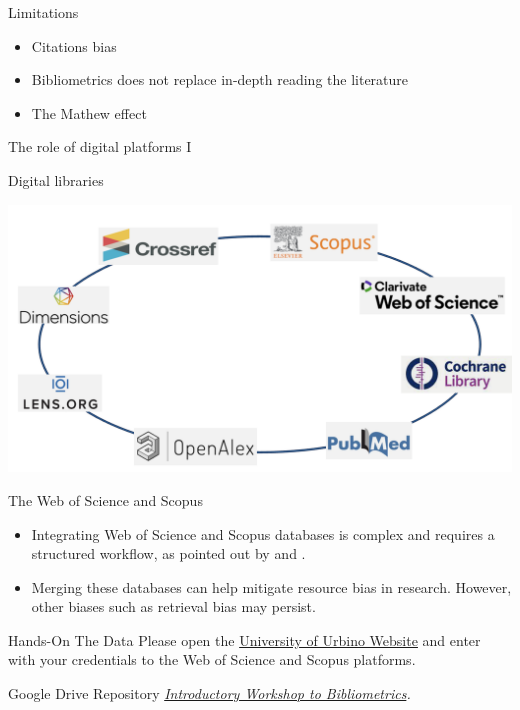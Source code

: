 \documentclass[
  ignorenonframetext,
]{beamer}
\begin{document}
\begin{frame}{Limitations}
\protect\hypertarget{limitations}{}
\begin{itemize}
\item
  Citations bias
\item
  Bibliometrics does not replace in-depth reading the literature
\item
  The Mathew effect
\end{itemize}
\end{frame}

\begin{frame}{The role of digital platforms I}
\protect\hypertarget{the-role-of-digital-platforms-i}{}
\begin{block}{Digital libraries}
\protect\hypertarget{digital-libraries}{}
\begin{center}
\includegraphics[width=1\textwidth]{pic_4.png}
\end{center}
\end{block}
\end{frame}

\begin{frame}{The Web of Science and Scopus}
\protect\hypertarget{the-web-of-science-and-scopus}{}
\begin{itemize}
\item
  Integrating Web of Science and Scopus databases is complex and
  requires a structured workflow, as pointed out by
  \citet{echchakoui2020} and \citet{caputo2022}.
\item
  Merging these databases can help mitigate resource bias in research.
  However, other biases such as retrieval bias may persist.
\end{itemize}
\end{frame}

\begin{frame}{Hands-On The Data}
\protect\hypertarget{hands-on-the-data}{}
Please open the \href{https://www.uniurb.it/}{University of Urbino
Website} and enter with your credentials to the Web of Science and
Scopus platforms.

Google Drive Repository
\href{https://drive.google.com/drive/folders/1Mw6cWYZZxRlZTQAUYZofifyY_xkmcVeK}{\emph{Introductory
Workshop to Bibliometrics}}\emph{.}
\end{frame}
\end{document}
